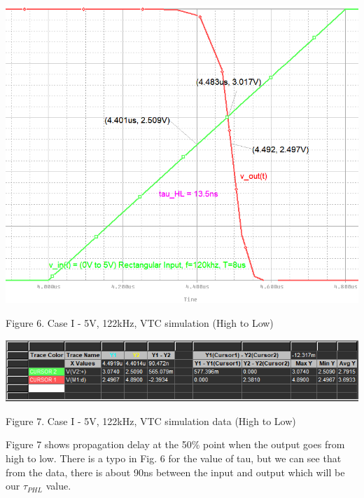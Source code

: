 \documentclass[conference]{IEEEtran}
\begin{document}
\begin{center}
    \centerline{\includegraphics[scale = 0.39]{figures/case1_results_HL.png}}
    Figure 6. Case I - 5V, 122kHz, VTC simulation (High to Low)
\end{center}

\begin{center}
    \centerline{\includegraphics[scale = 0.45]{figures/case1_results_HL_data.png}}
    Figure 7. Case I - 5V, 122kHz, VTC simulation data (High to Low)
\end{center} 

Figure 7 shows propagation delay at the 50\% point when the output goes from 
high to low. There is a typo in Fig. 6 for the value of tau, but we can see that
from the data, there is about 90ns between the input and output which will be our 
$\tau_{PHL}$ value.
\end{document}
